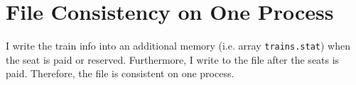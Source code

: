 \section{File Consistency on One Process}

I write the train info into an additional memory (i.e. array \verb|trains.stat|) when the seat is paid or reserved. Furthermore, I write to the file after the seats is paid. Therefore, the file is consistent on one process. 